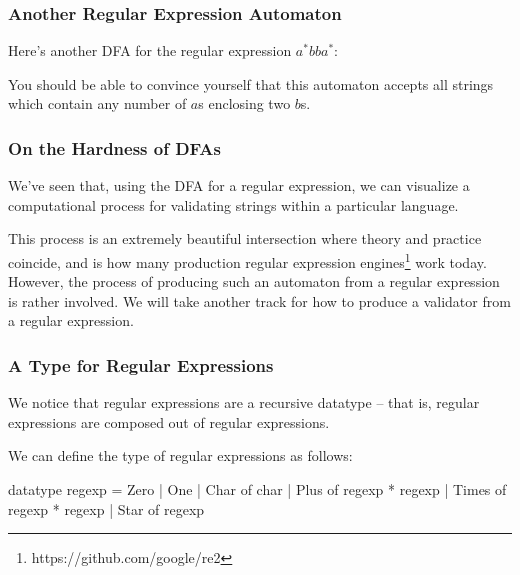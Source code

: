 \documentclass[aspectratio=169]{beamer}
\begin{document}
\begin{frame}[fragile]
  \frametitle{Another Regular Expression Automaton}

  Here's another DFA for the regular expression $a^*bba^*$:

  \vspace{\fill}


  \pause
  \vspace{\fill}

  You should be able to convince yourself that this automaton accepts
  all strings which contain any number of $a$s enclosing two $b$s.
\end{frame}



\begin{frame}[fragile]
  \frametitle{On the Hardness of DFAs}

  We've seen that, using the DFA for a regular expression, we can
  visualize a computational process for validating strings within a
  particular language.

  \pause
  \vspace{\fill}

  This process is an extremely beautiful intersection where theory and
  practice coincide, and is how many production regular expression engines\footnote{
    https://github.com/google/re2
  }
  work today. However, the process of producing such an automaton from
  a regular expression is rather involved. We will take another track
  for how to produce a validator from a regular expression.
\end{frame}

\begin{frame}[fragile]
  \frametitle{A Type for Regular Expressions}

  \tgs

  We notice that regular expressions are a recursive datatype -- that is,
  regular expressions are composed out of regular expressions.

  \vspace{\fill}

  We can define the type of regular expressions as follows:

  \begin{codeblock}
    datatype regexp =
        Zero
      | One
      | Char of char
      | Plus of regexp * regexp
      | Times of regexp * regexp
      | Star of regexp
  \end{codeblock}
\end{frame}
\end{document}
